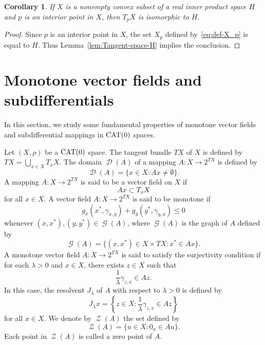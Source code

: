 \documentclass[draft]{amsart}
\numberwithin{equation}{section}
\DeclareMathOperator{\Gra}{\mathcal{G}}
\DeclareMathOperator{\D}{\mathcal{D}}
\DeclareMathOperator{\Zer}{\mathcal{Z}}
\newcommand{\CAT}{\textup{CAT}}
\theoremstyle{plain}
\newtheorem{corollary}[theorem]{Corollary}
\theoremstyle{definition}
\theoremstyle{remark}
\begin{document}
\begin{corollary}\label{cor:Tangent-space-H}
 If $X$ is a nonempty convex subset of a real inner product space $H$ 
 and $p$ is an interior point in $X$, then 
 $T_pX$ is isomorphic to $H$. 
\end{corollary}

\begin{proof}
 Since $p$ is an interior point in $X$, 
 the set $X_p$ defined by~\eqref{eq:def-X_p} 
 is equal to $H$. 
 Thus Lemma~\ref{lem:Tangent-space-H} implies the conclusion. 
\end{proof}

\section{Monotone vector fields and subdifferentials}

In this section, we study some fundamental properties of 
monotone vector fields and subdifferential mappings in $\CAT(0)$ spaces. 

Let $(X, \rho)$ be a $\CAT(0)$ space. 
The tangent bundle $TX$ of $X$ is defined by 
$TX=\bigcup_{x\in X}T_xX$. 
The domain $\D(A)$ of a mapping 
$A\colon X\to 2^{TX}$ is defined by 
\[
 \D(A)=\{x\in X: Ax\neq \emptyset\}. 
\]
A mapping $A\colon X \to 2^{TX}$ is said to be 
a vector field on $X$ if 
\[
 Ax \subset T_xX
\]
for all $x\in X$. A vector field $A\colon X\to 2^{TX}$ 
is said to be monotone if 
\[
 g_x(x^*, \gamma_{x, y}) 
 + 
 g_y(y^*, \gamma_{y, x}) \leq 0
\]
whenever $(x, x^*), (y, y^*) \in \Gra(A)$, where 
$\Gra (A)$ is the graph of $A$ defined by 
\[
 \Gra(A) = \bigl\{(x, x^*)\in X\times TX: x^*\in Ax\bigr\}. 
\]
A monotone vector field $A\colon X\to 2^{TX}$ is said to satisfy 
the surjectivity condition if for each $\lambda>0$ and $x\in X$, 
there exists $z\in X$ such that 
\[
 \frac{1}{\lambda} \gamma_{z, x} \in Az. 
\]
In this case, the resolvent $J_{\lambda}$ of $A$ 
with respect to $\lambda>0$ 
is defined by 
\[
 J_{\lambda}x = \left\{z\in X: \frac{1}{\lambda} \gamma_{z, x} \in Az\right\}
\]
for all $x\in X$. We denote by $\Zer (A)$ the set defined by 
\[
 \Zer (A) = \{u\in X: 0_u\in Au\}.  
\]
Each point in $\Zer (A)$ is called a zero point of $A$. 
\end{document}
